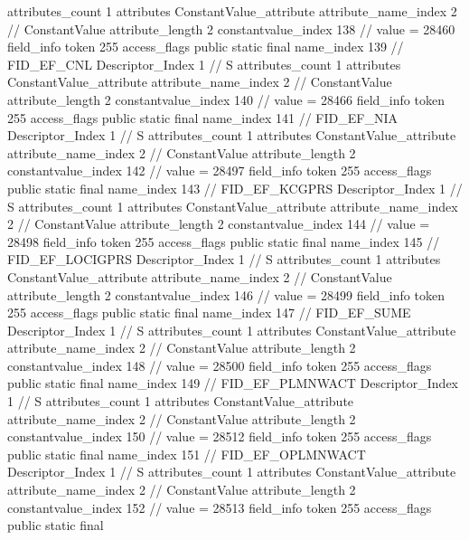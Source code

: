 {{{{{				attributes_count	1
				attributes {
				ConstantValue_attribute {
					attribute_name_index	2		// ConstantValue
					attribute_length	2
					constantvalue_index	138		// value = 28460
				}
				}
			}
			field_info {
				token	255
				access_flags	public static final
				name_index	139		// FID_EF_CNL
				Descriptor_Index	1		// S
				attributes_count	1
				attributes {
				ConstantValue_attribute {
					attribute_name_index	2		// ConstantValue
					attribute_length	2
					constantvalue_index	140		// value = 28466
				}
				}
			}
			field_info {
				token	255
				access_flags	public static final
				name_index	141		// FID_EF_NIA
				Descriptor_Index	1		// S
				attributes_count	1
				attributes {
				ConstantValue_attribute {
					attribute_name_index	2		// ConstantValue
					attribute_length	2
					constantvalue_index	142		// value = 28497
				}
				}
			}
			field_info {
				token	255
				access_flags	public static final
				name_index	143		// FID_EF_KCGPRS
				Descriptor_Index	1		// S
				attributes_count	1
				attributes {
				ConstantValue_attribute {
					attribute_name_index	2		// ConstantValue
					attribute_length	2
					constantvalue_index	144		// value = 28498
				}
				}
			}
			field_info {
				token	255
				access_flags	public static final
				name_index	145		// FID_EF_LOCIGPRS
				Descriptor_Index	1		// S
				attributes_count	1
				attributes {
				ConstantValue_attribute {
					attribute_name_index	2		// ConstantValue
					attribute_length	2
					constantvalue_index	146		// value = 28499
				}
				}
			}
			field_info {
				token	255
				access_flags	public static final
				name_index	147		// FID_EF_SUME
				Descriptor_Index	1		// S
				attributes_count	1
				attributes {
				ConstantValue_attribute {
					attribute_name_index	2		// ConstantValue
					attribute_length	2
					constantvalue_index	148		// value = 28500
				}
				}
			}
			field_info {
				token	255
				access_flags	public static final
				name_index	149		// FID_EF_PLMNWACT
				Descriptor_Index	1		// S
				attributes_count	1
				attributes {
				ConstantValue_attribute {
					attribute_name_index	2		// ConstantValue
					attribute_length	2
					constantvalue_index	150		// value = 28512
				}
				}
			}
			field_info {
				token	255
				access_flags	public static final
				name_index	151		// FID_EF_OPLMNWACT
				Descriptor_Index	1		// S
				attributes_count	1
				attributes {
				ConstantValue_attribute {
					attribute_name_index	2		// ConstantValue
					attribute_length	2
					constantvalue_index	152		// value = 28513
				}
				}
			}
			field_info {
				token	255
				access_flags	public static final
}}}}}
